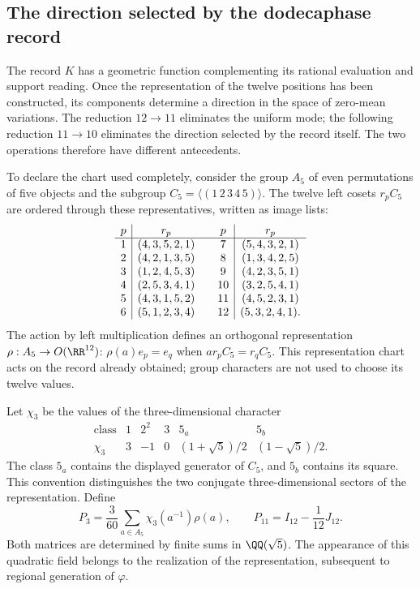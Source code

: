 \subsection{The direction selected by the dodecaphase record}
\label{exc:k-direccion}

The record \(K\) has a geometric function complementing its
rational evaluation and support reading. Once the representation
of the twelve positions has been constructed, its components determine a
direction in the space of zero-mean variations. The reduction
\(12\to11\) eliminates the uniform mode; the following reduction
\(11\to10\) eliminates the direction selected by the record itself.
The two operations therefore have different antecedents.

To declare the chart used completely, consider the group
\(A_5\) of even permutations of five objects and the subgroup
\(C_5=\langle(1\,2\,3\,4\,5)\rangle\). The twelve left cosets
\(r_pC_5\) are ordered through these representatives, written as
image lists:
\[
\begin{array}{c|c@{\qquad}c|c}
p&r_p&p&r_p\\ \hline
1&(4,3,5,2,1)&7&(5,4,3,2,1)\\
2&(4,2,1,3,5)&8&(1,3,4,2,5)\\
3&(1,2,4,5,3)&9&(4,2,3,5,1)\\
4&(2,5,3,4,1)&10&(3,2,5,4,1)\\
5&(4,3,1,5,2)&11&(4,5,2,3,1)\\
6&(5,1,2,3,4)&12&(5,3,2,4,1).
\end{array}
\]
The action by left multiplication defines an orthogonal
representation \(\rho:A_5\to O(\RR^{12})\):
\(\rho(a)e_p=e_q\) when \(ar_pC_5=r_qC_5\).
This representation chart acts on the record already obtained;
group characters are not used to choose its twelve values.

Let \(\chi_3\) be the values of the three-dimensional character
\[
\begin{array}{c|ccccc}
\text{class}&1&2^2&3&5_a&5_b\\ \hline
\chi_3&3&-1&0&(1+\sqrt5)/2&(1-\sqrt5)/2.
\end{array}
\]
The class \(5_a\) contains the displayed generator of \(C_5\), and
\(5_b\) contains its square. This convention distinguishes the two
conjugate three-dimensional sectors of the representation. Define
\begin{equation}
 P_3=\frac3{60}\sum_{a\in A_5}\chi_3(a^{-1})\rho(a),
 \qquad P_{11}=I_{12}-\frac1{12}J_{12}.
 \label{eq:k-proyectores-incidencia}
\end{equation}
Both matrices are determined by finite sums in
\(\QQ(\sqrt5)\). The appearance of this quadratic field belongs
to the realization of the representation, subsequent to regional
generation of \(\varphi\).

